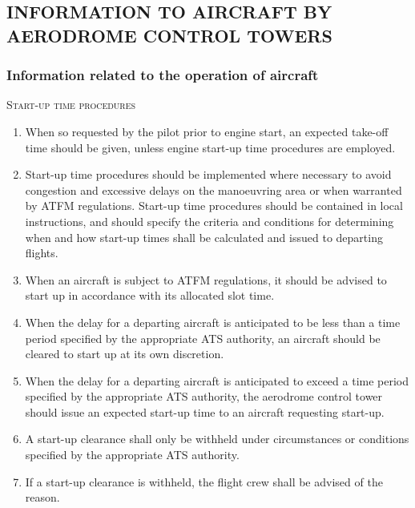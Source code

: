 \subsection[Information to aircraft by aerodrome control towers]{INFORMATION TO AIRCRAFT BY AERODROME CONTROL TOWERS}

\subsubsection{Information related to the operation of aircraft}


\begin{enumeratesc}
    \item \textsc{Start-up time procedures}
    \begin{enumerate}
        \item When so requested by the pilot prior to engine start, an expected take-off time should be given, unless engine start-up time procedures are employed.
        \item Start-up time procedures should be implemented where necessary to avoid congestion and excessive delays on the manoeuvring area or when warranted by ATFM regulations. Start-up time procedures should be contained in local instructions, and should specify the criteria and conditions for determining when and how start-up times shall be calculated and issued to departing flights.
        \item When an aircraft is subject to ATFM regulations, it should be advised to start up in accordance with its allocated slot time.
        \item When the delay for a departing aircraft is anticipated to be less than a time period specified by the appropriate ATS authority, an aircraft should be cleared to start up at its own discretion.
        \item When the delay for a departing aircraft is anticipated to exceed a time period specified by the appropriate ATS authority, the aerodrome control tower should issue an expected start-up time to an aircraft requesting start-up.
        \item A start-up clearance shall only be withheld under circumstances or conditions specified by the appropriate ATS authority.
        \item If a start-up clearance is withheld, the flight crew shall be advised of the reason.
    \end{enumerate}


\end{enumeratesc}
